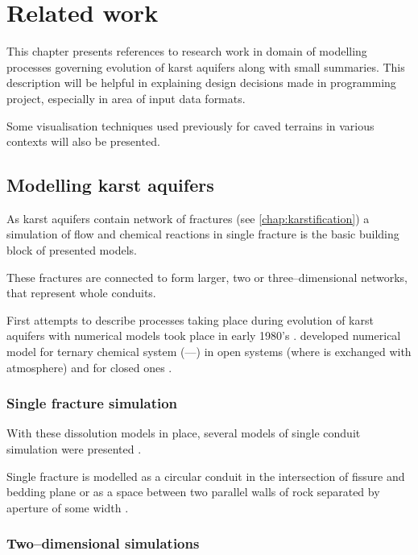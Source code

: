 \chapter{Related work}
\label{chap:related}

This chapter presents references to research work in domain of modelling processes
governing evolution of karst aquifers along with small summaries. This
description will be helpful in explaining design decisions made in programming
project, especially in area of input data formats.

Some visualisation techniques used previously for caved terrains in various
contexts will also be presented.

\section{Modelling karst aquifers}

As karst aquifers contain network of fractures (see \autoref{chap:karstification})
a simulation of flow and chemical reactions in single fracture is the basic
building block of presented models.

These fractures are connected to form larger, two or three--dimensional networks,
that represent whole conduits.

First attempts to describe processes taking place during evolution of karst
aquifers with numerical models took place in early 1980's \parencite[p. 3]{hiller2013}.
\Cite{Buhmann1985189} developed numerical model for ternary chemical system
(----) in open systems (where  is exchanged
with atmosphere) and for closed ones \parencite{Buhmann1985109}.

\subsection{Single fracture simulation}

With these dissolution models in place, several models of single conduit simulation
were presented \parencite[p. 4]{hiller2013}.

Single fracture is modelled as a circular conduit in the intersection
of fissure and bedding plane \parencite{Kaufmann200962} or as a space between
two parallel walls of rock separated by aperture of some width \parencite{dreybrodt2002}.

\subsection{Two--dimensional simulations}

